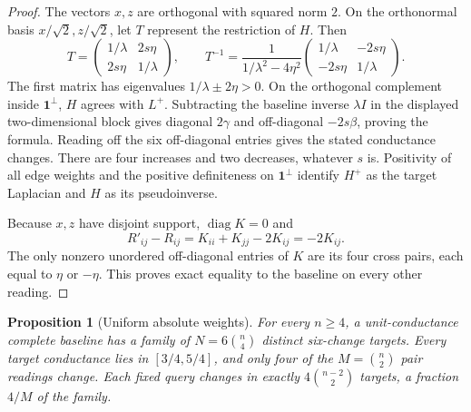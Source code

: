 \documentclass[11pt,letterpaper]{article}
\newtheorem{proposition}[theorem]{Proposition}
\newcommand{\one}{\mathbf 1}
\newcommand{\diag}{\operatorname{diag}}
\begin{document}
\begin{proof}
The vectors $x,z$ are orthogonal with squared norm $2$. On the orthonormal basis $x/\sqrt2,z/\sqrt2$, let $T$ represent the restriction of $H$. Then
\[
 T=
 \begin{pmatrix}1/\lambda&2s\eta\\2s\eta&1/\lambda\end{pmatrix},\qquad
 T^{-1}=
 \frac{1}{1/\lambda^2-4\eta^2}
 \begin{pmatrix}1/\lambda&-2s\eta\\-2s\eta&1/\lambda\end{pmatrix}.
\]
The first matrix has eigenvalues $1/\lambda\pm2\eta>0$. On the orthogonal complement inside $\one^\perp$, $H$ agrees with $L^+$. Subtracting the baseline inverse $\lambda I$ in the displayed two-dimensional block gives diagonal $2\gamma$ and off-diagonal $-2s\beta$, proving the formula. Reading off the six off-diagonal entries gives the stated conductance changes. There are four increases and two decreases, whatever $s$ is. Positivity of all edge weights and the positive definiteness on $\one^\perp$ identify $H^+$ as the target Laplacian and $H$ as its pseudoinverse.

Because $x,z$ have disjoint support, $\diag K=0$ and
\[
 R'_{ij}-R_{ij}=K_{ii}+K_{jj}-2K_{ij}=-2K_{ij}.
\]
The only nonzero unordered off-diagonal entries of $K$ are its four cross pairs, each equal to $\eta$ or $-\eta$. This proves exact equality to the baseline on every other reading.
\end{proof}

\begin{proposition}[Uniform absolute weights]\label{prop:unit}
For every $n\ge4$, a unit-conductance complete baseline has a family of $N=6\binom n4$ distinct six-change targets. Every target conductance lies in $[3/4,5/4]$, and only four of the $M=\binom n2$ pair readings change. Each fixed query changes in exactly $4\binom{n-2}2$ targets, a fraction $4/M$ of the family.
\end{proposition}
\end{document}
